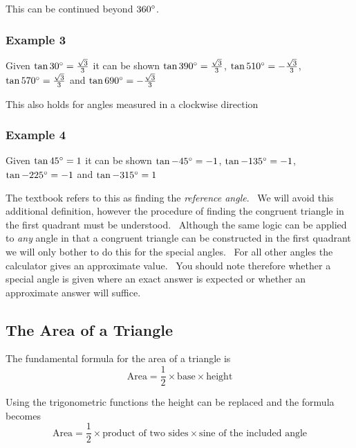 This can be continued beyond $360 \mbox{{\ensuremath{{}^\circ}}}$. 

\subsubsection{Example 3}
Given $\tan  30 \mbox{{\ensuremath{{}^\circ}}} =\frac{\sqrt{3}}{3}$ it can be shown $\tan  390 \mbox{{\ensuremath{{}^\circ}}} =\frac{\sqrt{3}}{3}$, $\tan  510 \mbox{{\ensuremath{{}^\circ}}} = -\frac{\sqrt{3}}{3}$, $\tan  570 \mbox{{\ensuremath{{}^\circ}}} =\frac{\sqrt{3}}{3}$ and $\tan  690 \mbox{{\ensuremath{{}^\circ}}} = -\frac{\sqrt{3}}{3}$ 

This also holds for angles measured in a clockwise direction 

\subsubsection{Example 4}
Given $\tan  45 \mbox{{\ensuremath{{}^\circ}}} =1$ it can be shown $\tan  -45 \mbox{{\ensuremath{{}^\circ}}} = -1$, $\tan  -135 \mbox{{\ensuremath{{}^\circ}}} = -1$, $\tan  -225 \mbox{{\ensuremath{{}^\circ}}} = -1$ and $\tan  -315 \mbox{{\ensuremath{{}^\circ}}} =1$ 

The textbook refers to this as finding the \emph{reference angle}. \ We
will avoid this additional definition, however the procedure of finding the congruent triangle in the first quadrant must be understood. \ Although
the same logic can be applied to \emph{any} angle in that a congruent triangle can be constructed in the first quadrant we will only bother
to do this for the special angles. \ For all other angles the calculator gives an approximate value. \ You
should note therefore whether a special angle is given where an exact answer is expected or whether an approximate answer will suffice. 

\subsection{The Area of a Triangle}
The fundamental formula for the area of a triangle is
\begin{equation*}\text{Area} =\frac{1}{2} \times \text{base} \times \text{height}
\end{equation*}

Using the trigonometric functions the height can be replaced
and the formula becomes
\begin{equation*}\text{Area} =\frac{1}{2} \times \text{product of two sides} \times \text{sine of the included angle}
\end{equation*}

